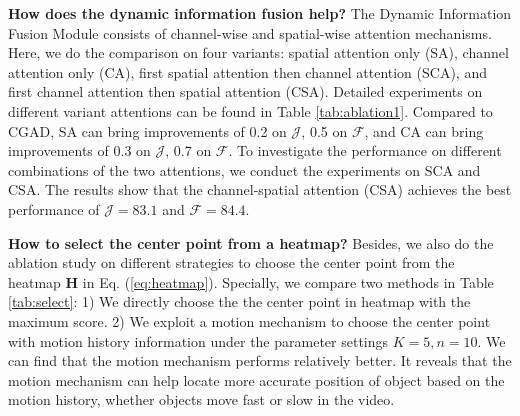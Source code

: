 \documentclass[letterpaper]{article} \usepackage{aaai20}  \usepackage{times}  \usepackage{helvet} \usepackage{courier}  \usepackage[hyphens]{url}  \usepackage{graphicx} \urlstyle{rm} \def\UrlFont{\rm}  \usepackage{graphicx}  \frenchspacing  \setlength{\pdfpagewidth}{8.5in}  \setlength{\pdfpageheight}{11in}  \usepackage{amssymb}
\begin{document}
\noindent \textbf{How does the dynamic information fusion help?} 
The Dynamic Information Fusion Module consists of channel-wise and spatial-wise attention mechanisms. Here, we do the comparison on four variants: spatial attention only (SA), channel attention only (CA), first spatial attention then channel attention (SCA), and first channel attention then spatial attention (CSA). Detailed experiments on different variant attentions can be found in Table \ref{tab:ablation1}.
Compared to CGAD, SA can bring improvements of 0.2 on $\mathcal{J}$, 0.5 on $\mathcal{F}$, and CA can bring improvements of 0.3 on $\mathcal{J}$, 0.7 on $\mathcal{F}$. 
To investigate the performance on different combinations of the two attentions, we conduct the experiments on SCA and CSA. The results show that the channel-spatial attention (CSA) achieves the best performance of $\mathcal{J}=83.1$ and $\mathcal{F}=84.4$.

\noindent \textbf{How to select the center point from a heatmap?} 
Besides, we also do the ablation study on different strategies to choose the center point from the heatmap $\bm{H}$ in Eq. (\ref{eq:heatmap}). Specially, we compare two methods in Table \ref{tab:select}: 1) We directly choose the the center point in heatmap with the maximum score. 2) We exploit a motion mechanism \cite{xu2019mhp} to choose the center point with motion history information under the parameter settings $K=5,n=10$. We can find that the motion mechanism performs relatively better. 
It reveals that
the motion mechanism can help locate more accurate position of object based on the motion history,
whether objects move fast or slow in the video.
\end{document}
